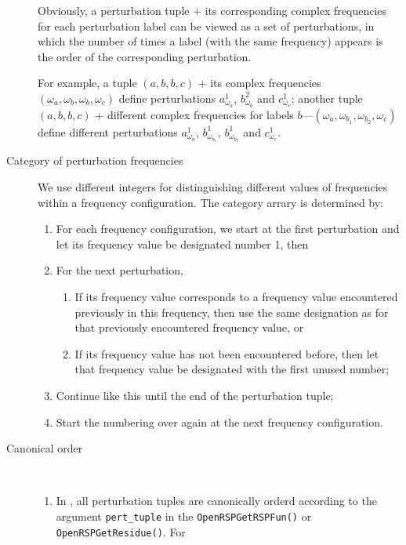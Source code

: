 \begin{description}
    Obviously, a perturbation tuple $+$ its corresponding complex
    frequencies for each perturbation label can be viewed as a set of
    perturbations, in which the number of times a label (with the same
    frequency) appears is the order of the corresponding perturbation.

    For example, a tuple $(a,b,b,c)$ $+$ its complex frequencies
    $(\omega_{a},\omega_{b},\omega_{b},\omega_{c})$ define perturbations
    $a_{\omega_{a}}^{1}$, $b_{\omega_{b}}^{2}$ and $c_{\omega_{c}}^{1}$;
    another tuple $(a,b,b,c)$ $+$ different complex frequencies for labels
    $b$---$(\omega_{a},\omega_{b_{1}},\omega_{b_{2}},\omega_{c})$ define
    different perturbations $a_{\omega_{a}}^{1}$, $b_{\omega_{b_{1}}}^{1}$,
    $b_{\omega_{b_{2}}}^{1}$ and $c_{\omega_{c}}^{1}$.
  \item[Category of perturbation frequencies] We use different integers for
    distinguishing different values of frequencies within a frequency
    configuration. The category arrary is determined by:
    \begin{enumerate}
      \item For each frequency configuration, we start at the first
        perturbation and let its frequency value be designated number 1, then
      \item For the next perturbation,
        \begin{enumerate}
          \item If its frequency value corresponds to a frequency value
            encountered previously in this frequency, then use the same
            designation as for that previously encountered frequency value, or
          \item If its frequency value has not been encountered before, then
            let that frequency value be designated with the first unused
            number;
        \end{enumerate}
      \item Continue like this until the end of the perturbation tuple;
      \item Start the numbering over again at the next frequency configuration.
    \end{enumerate}
  \item[Canonical order]~
    \begin{enumerate}
      \item In \LibName, all perturbation tuples are canonically orderd
        according to the argument \texttt{pert\_tuple} in the
        \texttt{OpenRSPGetRSPFun()} or \texttt{OpenRSPGetResidue()}. For

\end{enumerate}
\end{description}
